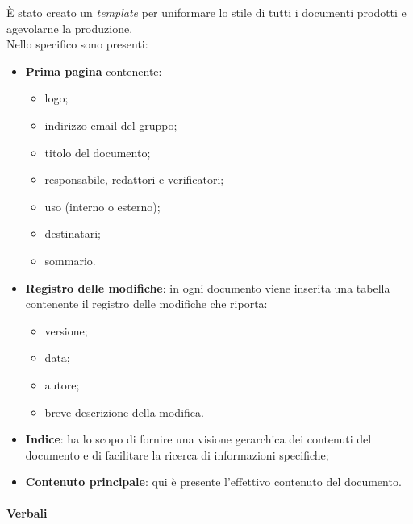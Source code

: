 \noindent È stato creato un \textit{template} per uniformare lo stile di tutti i documenti prodotti e agevolarne la produzione.\\
Nello specifico sono presenti:
\begin{itemize}
    \item \textbf{Prima pagina} contenente:
          \begin {itemize}
    \item logo;
    \item indirizzo email del gruppo;
    \item titolo del documento;
    \item responsabile, redattori e verificatori;
    \item uso (interno o esterno);
    \item destinatari;
    \item sommario.
\end{itemize}
\item \textbf{Registro delle modifiche}: in ogni documento viene inserita una tabella contenente il registro delle modifiche che riporta:
\begin{itemize}
    \item versione;
    \item data;
    \item autore;
    \item breve descrizione della modifica.
\end{itemize}
\item \textbf{Indice}: ha lo scopo di fornire una visione gerarchica dei contenuti del documento e di facilitare la ricerca di informazioni specifiche;
\item \textbf{Contenuto principale}: qui è presente l'effettivo contenuto del documento.
\end{itemize}

\paragraph{Verbali}~

